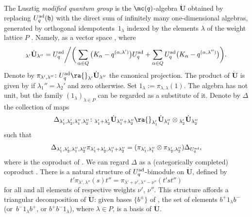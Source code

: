 The Lusztig {\it modified quantum group} is the $\mc(q)$-algebra $\dot{\mathbf{U}}$ obtained by replacing $U_q^{\rm ad}(\mathfrak{h})$ with the direct sum of infinitely many one-dimensional algebras, generated by orthogonal idempotents~$1_\lambda$ indexed by the elements $\lambda$ of the weight lattice $P$ \cite[Chapter~23]{Lusztig}. Namely, as a vector space , where
\[{}_{\lambda'}\dot{\mathbf{U}}{}_{\lambda''} = U_q^{\rm ad}\bigg/\bigg(\sum_{\alpha\in Q} \big(K_\alpha -q^{(\alpha,\lambda')}\big)U_q^{\rm ad}+ \sum_{\alpha\in Q} U_q^{\rm ad}\big(K_\alpha -q^{(\alpha,\lambda'')}\big)\bigg).\]
Denote by $\pi_{\lambda',\lambda''}\colon U_q^{\rm ad} \ra {}_{\lambda'}\dot{\mathbf{U}}{}_{\lambda''}$ the canonical projection. The product of $\dot{\mathbf{U}}$ is given by  if $\lambda_1''=\lambda_2'$ and zero otherwise. Set $1_\lambda := \pi_{\lambda,\lambda}(1)$. The algebra  has not unit, but the family $(1_\lambda)_{\lambda\in P}$ can be regarded as a substitute of it. Denote by $\Delta$ the collection of maps
\[
\Delta_{\lambda'_1,\lambda'_2,\lambda''_1,\lambda_2''} \colon {}_{\lambda'_1+\lambda'_2} \dot{\mathbf{U}} {}_{\lambda''_1+\lambda''_2} \ra {}_{\lambda'_1} \dot{\mathbf{U}} {}_{\lambda''_1}\otimes {}_{\lambda'_2} \dot{\mathbf{U}} {}_{\lambda''_2}
\]
 such that
\begin{equation}\label{defcoprod}
\Delta_{\lambda'_1,\lambda'_2,\lambda''_1,\lambda''_2} \pi_{\lambda'_1+\lambda'_2,\lambda''_1+\lambda''_2} = (\pi_{\lambda'_1,\lambda''_1}\otimes \pi_{\lambda'_2,\lambda''_2})\Delta_{U_q^{\rm ad}},
\end{equation}
where  is the coproduct of . We can regard $\Delta$ as a (categorically completed) coproduct . There is a natural structure of $U_q^{\rm ad}$-bimodule on $\dot{\mathbf{U}}$, defined by
\begin{equation}\label{bimodstr}
t'\pi_{\lambda',\lambda''}(s)t'' = \pi_{\lambda'+\nu',\lambda''-\nu''}(t'st'')
\end{equation}
for all  and all elements  of respective weights $\nu'$, $\nu''$. This structure affords a triangular decomposition of $\dot{\mathbf{U}}$: given bases $\{b^\pm\}$ of , the set of elements $b^+1_\lambda b^-$ (or~$b^-1_\lambda b^+$, or $b^+b^-1_\lambda$), where $\lambda\in P$, is a basis of $\dot{\mathbf{U}}$.

